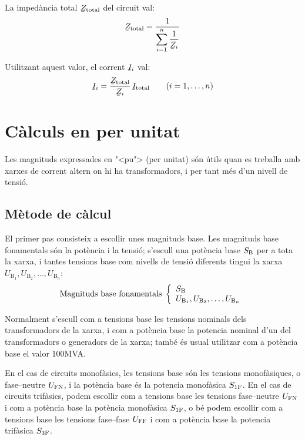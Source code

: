 La imped\`{a}ncia total $\cmplx{Z}\ped{total}$ del circuit val:
\begin{equation}
    \cmplx{Z}\ped{total} = \frac{1}{\displaystyle\sum_{i=1}^n \frac{1}{\cmplx{Z}_i}}
\end{equation}

Utilitzant aquest valor, el corrent $\cmplx{I}_i$ val:
\begin{equation}
    \cmplx{I}_i = \frac{\cmplx{Z}\ped{total}}{\cmplx{Z}_i}\,\cmplx{I}\ped{total} \qquad (i=1,\dots,n)\label{eq:div_corrent}
\end{equation}



\section{C\`{a}lculs en per unitat} \label{sec:seccio_pu} 

Les magnituds expressades en {"<}pu{">} (per unitat) s\'{o}n \'{u}tils quan es treballa
amb xarxes de corrent altern on hi ha transformadors, i per tant m\'{e}s d'un nivell de tensi\'{o}.

\subsection{M\`{e}tode de c\`{a}lcul} 

 El primer pas consisteix a
escollir unes magnituds base. Les magnituds base fonamentals s\'{o}n la
pot\`{e}ncia i la tensi\'{o}; s'escull una pot\`{e}ncia base $S_\mathrm{B}$ per a
tota la xarxa, i tantes tensions base com nivells de tensi\'{o}
diferents tingui la xarxa $U_{\text{B}_1}, U_{\text{B}_2}, \ldots,
U_{\text{B}_n}$:
\begin{equation}
   \text{Magnituds base fonamentals}\;\left\{
\begin{array}{l}
   S_\mathrm{B} \\
   U_{\text{B}_1}, U_{\text{B}_2}, \ldots, U_{\text{B}_n}
\end{array}
\right.
\end{equation}

Normalment s'escull com a tensions base les tensions nominals dels transformadors de la
xarxa, i com a pot\`{e}ncia base la potencia nominal d'un del transformadors o generadors de la xarxa; tamb\'{e} \'{e}s usual utilitzar com a pot\`{e}ncia base el valor 100\unit{MVA}.

En el cas de circuits monof\`{a}sics, les tensions base s\'{o}n les tensions monof\`{a}siques, o fase--neutre $U_\mathrm{FN}$, i la pot\`{e}ncia base \'{e}s la potencia monof\`{a}sica $S_\mathrm{1F}$. En el cas de circuits trif\`{a}sics, podem escollir com a tensions base les tensions fase--neutre $U_\mathrm{FN}$ i com a pot\`{e}ncia base la pot\`{e}ncia  monof\`{a}sica $S_\mathrm{1F}$, o b\'{e} podem escollir com a tensions base les tensions fase--fase $U_\mathrm{FF}$ i com a pot\`{e}ncia base la potencia trif\`{a}sica $S_\mathrm{3F}$.

